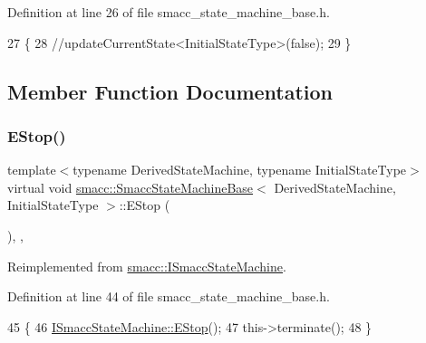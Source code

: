 Definition at line 26 of file smacc\+\_\+state\+\_\+machine\+\_\+base.\+h.


\begin{DoxyCode}
27     \{
28         \textcolor{comment}{//updateCurrentState<InitialStateType>(false);}
29     \}
\end{DoxyCode}


\subsection{Member Function Documentation}
\mbox{\label{structsmacc_1_1SmaccStateMachineBase_af1d145820c98089389e7de97a6744231}} 
\subsubsection{\texorpdfstring{E\+Stop()}{EStop()}}
{\footnotesize\ttfamily template$<$typename Derived\+State\+Machine, typename Initial\+State\+Type$>$ \\
virtual void \hyperlink{structsmacc_1_1SmaccStateMachineBase}{smacc\+::\+Smacc\+State\+Machine\+Base}$<$ Derived\+State\+Machine, Initial\+State\+Type $>$\+::E\+Stop (\begin{DoxyParamCaption}{ }\end{DoxyParamCaption})\hspace{0.3cm}{\ttfamily [inline]}, {\ttfamily [override]}, {\ttfamily [virtual]}}



Reimplemented from \hyperlink{classsmacc_1_1ISmaccStateMachine_a3c5aab001d1bb7edcb37413404e4a7c2}{smacc\+::\+I\+Smacc\+State\+Machine}.



Definition at line 44 of file smacc\+\_\+state\+\_\+machine\+\_\+base.\+h.


\begin{DoxyCode}
45     \{
46         \hyperlink{classsmacc_1_1ISmaccStateMachine_a3c5aab001d1bb7edcb37413404e4a7c2}{ISmaccStateMachine::EStop}();
47         this->terminate();
48     \}
\end{DoxyCode}
\mbox{\label{structsmacc_1_1SmaccStateMachineBase_a2dc1cd9a25b80f00602f1faab9b01e7b}} 
